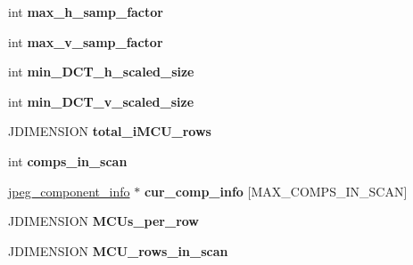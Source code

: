 \begin{DoxyCompactItemize}
\item 
\hypertarget{structjpeg__compress__struct_ae8de4e6079b80e3a81135d07934c640d}{int {\bfseries max\+\_\+h\+\_\+samp\+\_\+factor}}\label{structjpeg__compress__struct_ae8de4e6079b80e3a81135d07934c640d}

\item 
\hypertarget{structjpeg__compress__struct_a9e03a4eb7af87c682937caed3d341d4a}{int {\bfseries max\+\_\+v\+\_\+samp\+\_\+factor}}\label{structjpeg__compress__struct_a9e03a4eb7af87c682937caed3d341d4a}

\item 
\hypertarget{structjpeg__compress__struct_a99a75ca2f7569dcb4444e7cb35ce916f}{int {\bfseries min\+\_\+\+D\+C\+T\+\_\+h\+\_\+scaled\+\_\+size}}\label{structjpeg__compress__struct_a99a75ca2f7569dcb4444e7cb35ce916f}

\item 
\hypertarget{structjpeg__compress__struct_a5d63d182b17f0885fcabf88c6a08a9a5}{int {\bfseries min\+\_\+\+D\+C\+T\+\_\+v\+\_\+scaled\+\_\+size}}\label{structjpeg__compress__struct_a5d63d182b17f0885fcabf88c6a08a9a5}

\item 
\hypertarget{structjpeg__compress__struct_aef01162f4c66434929f933a40e695f9e}{J\+D\+I\+M\+E\+N\+S\+I\+O\+N {\bfseries total\+\_\+i\+M\+C\+U\+\_\+rows}}\label{structjpeg__compress__struct_aef01162f4c66434929f933a40e695f9e}

\item 
\hypertarget{structjpeg__compress__struct_a3387358088abbec1c8838499966c8f06}{int {\bfseries comps\+\_\+in\+\_\+scan}}\label{structjpeg__compress__struct_a3387358088abbec1c8838499966c8f06}

\item 
\hypertarget{structjpeg__compress__struct_a1cacb367b7d69227d3086ff105bca9ab}{\hyperlink{structjpeg__component__info}{jpeg\+\_\+component\+\_\+info} $\ast$ {\bfseries cur\+\_\+comp\+\_\+info} \mbox{[}M\+A\+X\+\_\+\+C\+O\+M\+P\+S\+\_\+\+I\+N\+\_\+\+S\+C\+A\+N\mbox{]}}\label{structjpeg__compress__struct_a1cacb367b7d69227d3086ff105bca9ab}

\item 
\hypertarget{structjpeg__compress__struct_a97f0c5e0ae932d1810007077443da684}{J\+D\+I\+M\+E\+N\+S\+I\+O\+N {\bfseries M\+C\+Us\+\_\+per\+\_\+row}}\label{structjpeg__compress__struct_a97f0c5e0ae932d1810007077443da684}

\item 
\hypertarget{structjpeg__compress__struct_ab605396740a26114095bf99c7c7349fb}{J\+D\+I\+M\+E\+N\+S\+I\+O\+N {\bfseries M\+C\+U\+\_\+rows\+\_\+in\+\_\+scan}}\label{structjpeg__compress__struct_ab605396740a26114095bf99c7c7349fb}


\end{DoxyCompactItemize}
